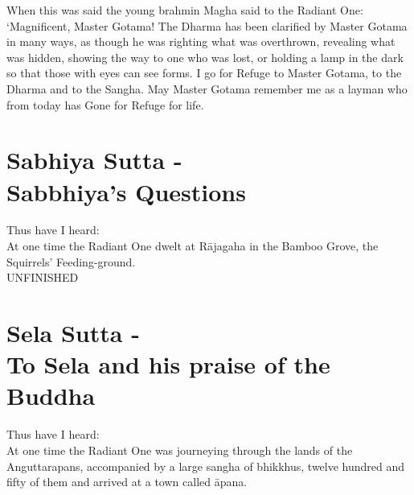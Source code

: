 When this was said the young brahmin Magha said to the Radiant One: `Magnificent, Master Gotama! The Dharma has been clarified by Master Gotama in many ways, as though he was righting what was overthrown, revealing what was hidden, showing the way to one who was lost, or holding a lamp in the dark so that those with eyes can see forms. I go for Refuge to Master Gotama, to the Dharma and to the Sangha. May Master Gotama remember me as a layman who from today has Gone for Refuge for life.

\begin{MyDescription}[(Sn. 487-509)]{}
\end{MyDescription}
   
\chapter{Sabhiya Sutta -\\ Sabbhiya's Questions}

Thus have I heard:\\

At one time the Radiant One dwelt at R\=ajagaha in the Bamboo Grove, the   Squirrels' Feeding-ground.\\
\lbrack UNFINISHED\rbrack
{}
\chapter{Sela Sutta -\\ To Sela and his praise of the Buddha}


Thus have I heard:\\
At one time the Radiant One was journeying through the lands of the Anguttarapans, accompanied by a large sangha of bhikkhus, twelve hundred and fifty of them and arrived at a town called \=apana.\\

